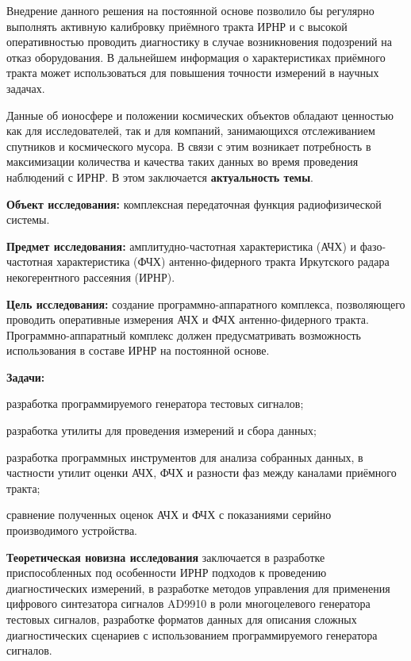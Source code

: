 \documentclass{report}
\begin{document}
Внедрение данного решения на постоянной основе позволило бы регулярно выполнять активную калибровку приёмного тракта ИРНР и с высокой оперативностью проводить диагностику в случае возникновения подозрений на отказ оборудования. В дальнейшем информация о характеристиках приёмного тракта может использоваться для повышения точности измерений в научных задачах.

Данные об ионосфере и положении космических объектов обладают ценностью как для исследователей, так и для компаний, занимающихся отслеживанием спутников и космического мусора. В связи с этим возникает потребность в максимизации количества и качества таких данных во время проведения наблюдений с ИРНР. В этом заключается {\bf актуальность темы}.

{\bf Объект исследования:} комплексная передаточная функция радиофизической системы.

{\bf Предмет исследования:} амплитудно-частотная характеристика (АЧХ) и фазо-частотная характеристика (ФЧХ) антенно-фидерного тракта Иркутского радара некогерентного рассеяния (ИРНР).

{\bf Цель исследования:} создание программно-аппаратного комплекса, позволяющего проводить оперативные измерения АЧХ и ФЧХ антенно-фидерного тракта. Программно-аппаратный комплекс должен предусматривать возможность использования в составе ИРНР на постоянной основе.

{\bf Задачи:}
\begin{enumarabic}
\item разработка программируемого генератора тестовых сигналов;
\item разработка утилиты для проведения измерений и сбора данных;
\item разработка программных инструментов для анализа собранных данных, в частности утилит оценки АЧХ, ФЧХ и разности фаз между каналами приёмного тракта;
\item сравнение полученных оценок АЧХ и ФЧХ с показаниями серийно производимого устройства.
\end{enumarabic}


{\bf Теоретическая новизна исследования} заключается в разработке приспособленных под особенности ИРНР подходов к проведению диагностических измерений, в разработке методов управления для применения цифрового синтезатора сигналов AD9910 в роли многоцелевого генератора тестовых сигналов, разработке форматов данных для описания сложных диагностических сценариев с использованием программируемого генератора сигналов.
\end{document}
